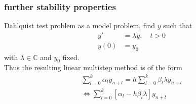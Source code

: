 	
	\subsubsection{further stability properties}
	
	\begin{frame}
		Dahlquist test problem as a model problem, find $y$ such that
		\begin{align}
			y' &= \lambda y, \quad t > 0 \\
			y(0) &= y_0
		\end{align}
		with $\lambda \in \mathbb{C}$ and $y_0$ fixed. \\
		Thus the resulting linear multistep method is of the form
		\begin{align*}
			\sum_{l=0}^{k} \alpha_l y_{n+l} = h \sum_{l=0}^{k} \beta_l \lambda y_{n+l} \\
			\iff \sum_{l=0}^{k}  [\alpha_l - h \beta_l \lambda] y_{n+l}
		\end{align*}
	\end{frame}
	

